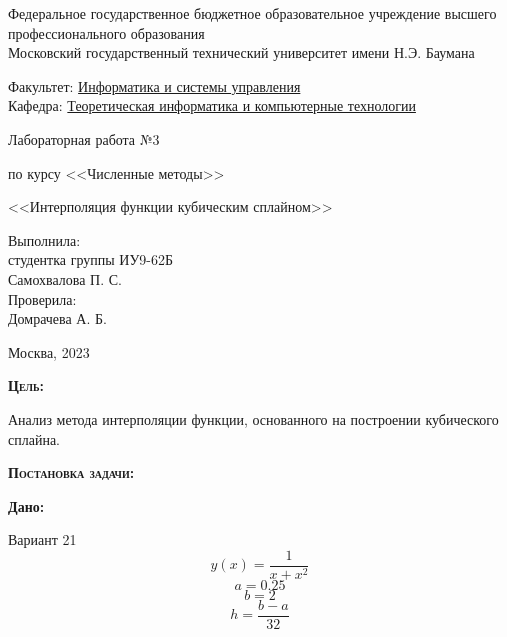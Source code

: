 \documentclass [12pt]{article}
\title{}
\date{}
\author{}
\begin{document}
\begin{titlepage}
\thispagestyle{empty}
\begin{center}
Федеральное государственное бюджетное образовательное учреждение высшего профессионального образования \\Московский государственный технический университет имени Н.Э. Баумана

\end{center}
\bigskip
\begin{flushleft}
Факультет: \underline{Информатика и системы управления}\\
Кафедра: \underline{Теоретическая информатика и компьютерные технологии}
\end{flushleft}
\vfill
\centerline{\large{Лабораторная работа №3}}
\centerline{\large{по курсу <<Численные методы>>}}
\centerline{\large{<<Интерполяция функции кубическим сплайном>>}}
\vfill
\hfill\parbox{5cm} {
           Выполнила:\\
           студентка группы ИУ9-62Б \hfill \\
           Самохвалова П. С.\hfill \medskip\\
           Проверила:\\
           Домрачева А. Б.\hfill
       }
\centerline{Москва, 2023}
\clearpage
\end{titlepage}

\textsc{\textbf{Цель:}}

Анализ метода интерполяции функции, основанного на построении кубического сплайна.

\textsc{\textbf{Постановка задачи:}}

\textbf{Дано:}

Вариант 21
$$y(x) = \frac{1}{x + x^2}$$
$$a = 0.25$$
$$b = 2$$
$$h = \frac{b - a}{32}$$
\end{document}
